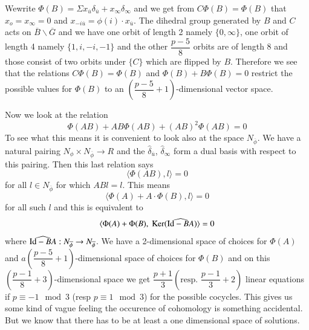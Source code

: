 We\pageoriginale write $\Phi(B)=\Sigma x_{\overline{u}}\delta_{\overline{u}}+x_{\infty}\delta_{\infty}$ and we get from $C\Phi(B)=\Phi(B)$ that $x_{o}=x_{\infty}=0$ and $x_{-i\overline{u}}=\phi(i)\cdot x_{\overline{u}}$. The dihedral group generated by $B$ and $C$ acts on $\overline{B}\backslash \overline{G}$ and we have one orbit of length 2 namely $\{0,\infty\}$, one orbit of length 4 namely $\{1,i,-i,-1\}$ and the other $\dfrac{p-5}{8}$ orbits are of length 8 and those consist of two orbits under $\{C\}$ which are flipped by $B$. Therefore we see that the relations $C\Phi(B)=\Phi(B)$ and $\Phi(B)+B\Phi(B)=0$ restrict the possible values for $\Phi(B)$ to an $\left(\dfrac{p-5}{8}+1\right)$-dimensional vector space.

Now we look at the relation
$$
\Phi(AB)+AB\Phi(AB)+(AB)^{2}\Phi(AB)=0
$$
To see what this means it is convenient to look also at the space $N_{\overline{\phi}}$. We have a natural pairing $N_{\phi}\times N_{\overline{\phi}}\to R$ and the $\widehat{\delta}_{\overline{u}}$, $\widehat{\delta}_{\infty}$ form a dual basis with respect to this pairing. Then this last relation says
$$
\langle \Phi(AB), l\rangle=0
$$
for all $l\in N_{\overline{\phi}}$ for which $ABl=l$. This means
$$
\langle \Phi(A)+A\cdot \Phi(B),l\rangle=0
$$
for all such $l$ and this is equivalent to
$$
\langle \Phi(A)+\Phi(B), \ \operatorname{Ker} (\widehat{\mathrm{Id}-BA})\rangle=0
$$
where $\widehat{\mathrm{Id}-BA}: N_{\overline{\phi}}\to N_{\overline{\phi}}$. We have a 2-dimensional space of choices for $\Phi(A)$ and $a\left(\dfrac{p-5}{8}+1\right)$-dimensional space of choices for $\Phi(B)$ and on this $\left(\dfrac{p-1}{8}+3\right)$-dimensional space we get $\dfrac{p+1}{3}\left(\text{resp. }\dfrac{p-1}{3}+2\right)$ linear equations if $p\equiv -1\mod 3$ (resp $p\equiv 1\mod 3$) for the possible cocycles. This gives us some kind of vague feeling the occurence of cohomology is something accidental. But we know that there has to be at least a one dimensional space of solutions.

